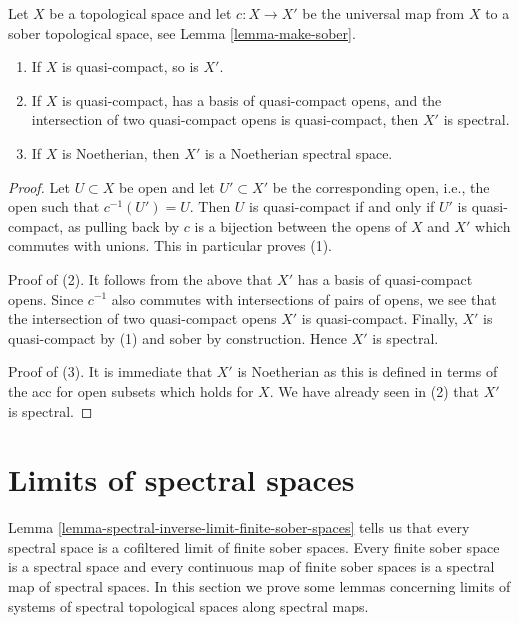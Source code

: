 \begin{lemma}
\label{lemma-Noetherian-goes-to-spectral}
Let $X$ be a topological space and let $c : X \to X'$ be the universal
map from $X$ to a sober topological space, see
Lemma \ref{lemma-make-sober}.
\begin{enumerate}
\item If $X$ is quasi-compact, so is $X'$.
\item If $X$ is quasi-compact, has a basis of quasi-compact opens,
and the intersection of two quasi-compact opens is quasi-compact, then 
$X'$ is spectral.
\item If $X$ is Noetherian, then $X'$ is a Noetherian spectral space.
\end{enumerate}
\end{lemma}

\begin{proof}
Let $U \subset X$ be open and let $U' \subset X'$ be the corresponding
open, i.e., the open such that $c^{-1}(U') = U$.
Then $U$ is quasi-compact if and only if $U'$ is quasi-compact,
as pulling back by $c$ is a bijection between the opens of
$X$ and $X'$ which commutes with unions. This in particular proves (1).

\medskip\noindent
Proof of (2). It follows from the above that $X'$ has a basis of
quasi-compact opens. Since $c^{-1}$ also
commutes with intersections of pairs of opens, we see that
the intersection of two quasi-compact opens $X'$ is quasi-compact.
Finally, $X'$ is quasi-compact by (1) and sober by construction.
Hence $X'$ is spectral.

\medskip\noindent
Proof of (3). It is immediate that $X'$ is Noetherian as this is defined
in terms of the acc for open subsets which holds for $X$. We have
already seen in (2) that $X'$ is spectral.
\end{proof}




\section{Limits of spectral spaces}
\label{section-limits-spectral}

\noindent
Lemma \ref{lemma-spectral-inverse-limit-finite-sober-spaces} tells us
that every spectral space is a cofiltered limit of finite sober
spaces. Every finite sober space is a spectral space and every continuous
map of finite sober spaces is a spectral map of spectral spaces.
In this section we prove some lemmas concerning limits of systems
of spectral topological spaces along spectral maps.

